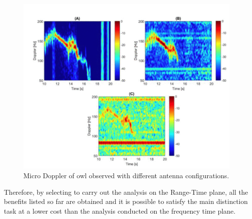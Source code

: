 \begin{figure}[h!]
\centering
\includegraphics[width=13cm]{FMCW mD analysis-chap4/img/md of owl.png}
\caption{Micro Doppler of owl observed with different antenna configurations. \cite{md_of_owl}}
\label{md_of_owl}
\end{figure}
Therefore, by selecting to carry out the analysis on the Range-Time plane, all the benefits listed so far are obtained and it is possible to satisfy the main distinction task at a lower cost than the analysis conducted on the frequency time plane.
